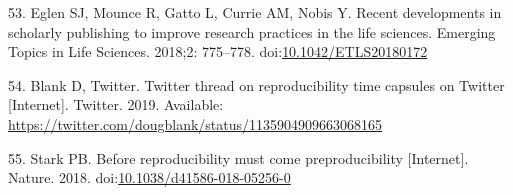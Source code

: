 \documentclass[10pt,letterpaper]{article}
\begin{document}
\leavevmode\hypertarget{ref-eglen_recent_2018}{}%
53. Eglen SJ, Mounce R, Gatto L, Currie AM, Nobis Y. Recent developments
in scholarly publishing to improve research practices in the life
sciences. Emerging Topics in Life Sciences. 2018;2: 775--778.
doi:\href{https://doi.org/10.1042/ETLS20180172}{10.1042/ETLS20180172}

\leavevmode\hypertarget{ref-blank_twitter_2019}{}%
54. Blank D, Twitter. Twitter thread on reproducibility time capsules on
Twitter {[}Internet{]}. Twitter. 2019. Available:
\url{https://twitter.com/dougblank/status/1135904909663068165}

\leavevmode\hypertarget{ref-stark_before_2018}{}%
55. Stark PB. Before reproducibility must come preproducibility
{[}Internet{]}. Nature. 2018.
doi:\href{https://doi.org/10.1038/d41586-018-05256-0}{10.1038/d41586-018-05256-0}

\nolinenumbers
\end{document}
